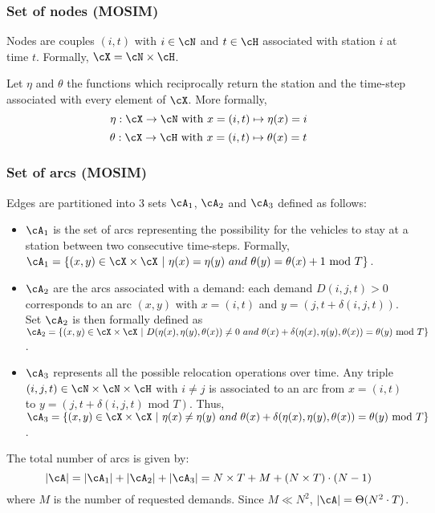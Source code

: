 \begin{bibunit}[ieeetr]
\subsubsection{Set of nodes (MOSIM)}
Nodes are couples $(i,t)$ with $i \in \cN$ and $t \in \cH$ associated with station $i$ at time $t$. Formally, $\cX = \cN \times \cH$.

Let $\eta$ and $\theta$ the functions which reciprocally return the station and the time-step associated with every element of $\cX$. More formally,
$$\eta:  {\cX  \rightarrow  \cN} \mbox{ with }  x=(i,t) \mapsto \eta(x)=i$$
$$\theta: { \cX \rightarrow  \cH} \mbox{ with } x=(i,t) \mapsto \theta(x)=t$$

\subsubsection{Set of arcs (MOSIM)}
Edges are partitioned into $3$ sets ${\cA}_1$, ${\cA}_2$ and ${\cA}_3$ defined as follows:
\begin{itemize}
\item 
${\cA}_1$ is the set of arcs representing the possibility for the vehicles to stay at a station between two consecutive time-steps.
Formally, 
${\cA}_1 = \{(x,y) \in {\cX} \times {\cX} ~|~ \eta(x) = \eta(y) ~and~ \theta(y) = \theta(x) + 1 \mbox{ mod } T\}$.

\item 
${\cA}_2$ are the arcs associated with a demand: each demand $D(i,j,t)>0$ corresponds to an arc  $(x,y)$ with
$x = (i, t)$ and $y = (j, t + \delta(i,j,t))$. Set ${\cA}_2$ is then formally defined as
${\cA}_2 = \{(x,y) \in {\cX} \times {\cX} ~|~ D(\eta(x), \eta(y), \theta(x)) \not = 0 ~and~ \theta(x) + \delta(\eta(x), \eta(y), \theta(x)) = \theta(y)\mbox{ mod } T\}$.

\item 
${\cA}_3$ represents all the possible relocation operations over time.
Any triple $(i,j,t) \in \cN \times \cN \times \cH$ with $i \neq j$ is associated to an arc from $x = (i,t)$ to $y = (j, t + \delta(i,j,t) \mbox{ mod } T)$.
Thus, 
${\cA}_3 = \{(x,y) \in {\cX} \times {\cX} ~|~ \eta(x) \not= \eta(y) ~and~ \theta(x) + \delta(\eta(x), \eta(y), \theta(x)) = \theta(y)  \mbox{ mod } T\}$.
\end{itemize}
The total number of arcs is given by:
$$|{\cA}| = |{\cA}_1| + |{\cA}_2| + |{\cA}_3| = N \times T + M + (N \times T) \cdot (N - 1)$$
where $M$ is the number of requested demands. Since $M \ll N^2$, $|{\cA}| = \Theta(N^2\cdot T)$.


\end{bibunit}
